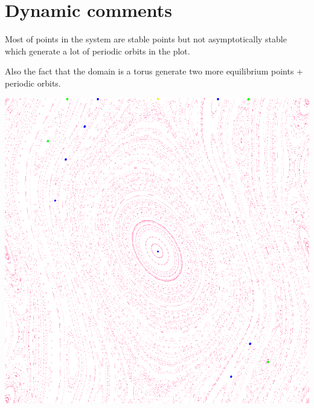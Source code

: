 \documentclass[]{scrartcl}
\begin{document}
\section{Dynamic comments}
Most of points in the system are stable points but not asymptotically stable which generate a lot of periodic orbits in the plot.

Also the fact that the domain is a torus generate two more equilibrium points + periodic orbits.


\includegraphics[width=\linewidth]{allk.png}
\end{document}
